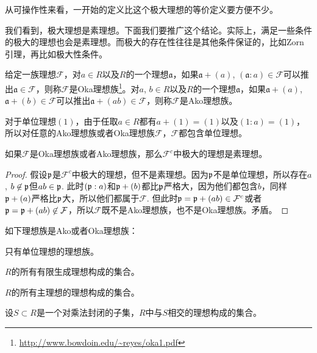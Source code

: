 从可操作性来看，一开始的定义比这个极大理想的等价定义要方便不少。

\para \label{oka}我们看到，极大理想是素理想。下面我们要推广这个结论。实际上，满足一些条件的极大的理想也会是素理想。而极大的存在性往往是其他条件保证的，比如Zorn引理，再比如极大性条件。

给定一族理想$\mathcal{F}$，对$a\in R$以及$R$的一个理想$\mathfrak{a}$，如果$\mathfrak{a}+(a)$, $(\mathfrak{a}:a)\in \mathcal{F}$可以推出$\mathfrak{a}\in \mathcal{F}$，则称$\mathcal{F}$是Oka理想族\footnote{\url{http://www.bowdoin.edu/~reyes/oka1.pdf}}。对$a$, $b\in R$以及$R$的一个理想$\mathfrak{a}$，如果$\mathfrak{a}+(a)$, $\mathfrak{a}+(b)\in \mathcal{F}$可以推出$\mathfrak{a}+(ab)\in \mathcal{F}$，则称$\mathcal{F}$是Ako理想族。

对于单位理想$(1)$，由于任取$a\in R$都有$a+(1)=(1)$以及$(1:a)=(1)$，所以对任意的Ako理想族或者Oka理想族$\mathcal{F}$，$\mathcal{F}$都包含单位理想。

\begin{pro} 如果$\mathcal{F}$是Oka理想族或者Ako理想族，那么$\mathcal{F}^c$中极大的理想是素理想。
\end{pro}

\begin{proof}
	假设$\mathfrak{p}$是$\mathcal{F}^c$中极大的理想，但不是素理想。因为$\mathfrak{p}$不是单位理想，所以存在$a$, $b\not\in \mathfrak{p}$但$ab\in\mathfrak{p}$. 此时$(\mathfrak{p}:a)$和$\mathfrak{p}+(b)$都比$\mathfrak{p}$严格大，因为他们都包含$b$，同样$\mathfrak{p}+(a)$严格比$\mathfrak{p}$大，所以他们都属于$\mathcal{F}$. 但此时$\mathfrak{p}=\mathfrak{p}+(ab)\in \mathcal{F}^c$或者$\mathfrak{p}=\mathfrak{p}+(ab)\not\in \mathcal{F}$，所以$\mathcal{F}$既不是Ako理想族，也不是Oka理想族。矛盾。
\end{proof}


\begin{pro}
如下理想族是Ako或者Oka理想族：
\begin{compactenum}[~~~1.]
\item 只有单位理想的理想族。
\item $R$的所有有限生成理想构成的集合。
\item $R$的所有主理想的理想构成的集合。
\item 设$S\subset R$是一个对乘法封闭的子集，$R$中与$S$相交的理想构成的集合。
\end{compactenum}
\end{pro}


